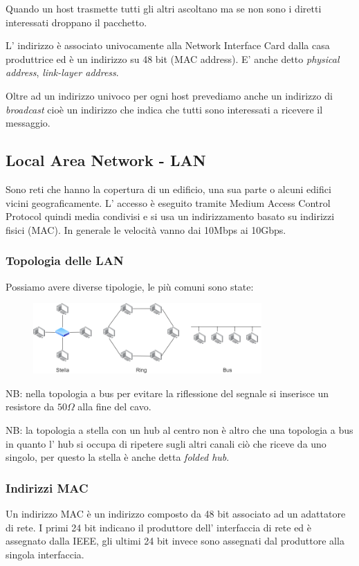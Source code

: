 Quando un host trasmette tutti gli altri ascoltano ma se non sono i diretti interessati droppano il pacchetto.

L' indirizzo è associato univocamente alla Network Interface Card dalla casa produttrice ed è un indirizzo su 48 bit (MAC address).
E' anche detto \emph{physical address}, \emph{link-layer address}.

Oltre ad un indirizzo univoco per ogni host prevediamo anche un indirizzo di \emph{broadcast} cioè un indirizzo che indica che tutti sono interessati a ricevere il messaggio.

\subsection{Local Area Network - LAN}
Sono reti che hanno la copertura di un edificio, una sua parte o alcuni edifici vicini geograficamente.
L' accesso è eseguito tramite Medium Access Control Protocol quindi media condivisi e si usa un indirizzamento basato su indirizzi fisici (MAC).
In generale le velocità vanno dai 10Mbps ai 10Gbps.

\subsubsection{Topologia delle LAN}
Possiamo avere diverse tipologie, le più comuni sono state:
\begin{figure}[H]
    \centering
    \includegraphics[width=330px]{images/3_Reti_connessione_diretta/network_topologies.png}
\end{figure}
NB: nella topologia a bus per evitare la riflessione del segnale si inserisce un resistore da $50 \Omega$ alla fine del cavo.

NB: la topologia a stella con un hub al centro non è altro che una topologia a bus in quanto l' hub si occupa di ripetere sugli altri canali ciò che riceve da uno singolo, per questo la stella è anche detta \emph{folded hub}.

\subsubsection{Indirizzi MAC}
Un indirizzo MAC è un indirizzo composto da 48 bit associato ad un adattatore di rete.
I primi 24 bit indicano il produttore dell' interfaccia di rete ed è assegnato dalla IEEE, gli ultimi 24 bit invece sono assegnati dal produttore alla singola interfaccia.


